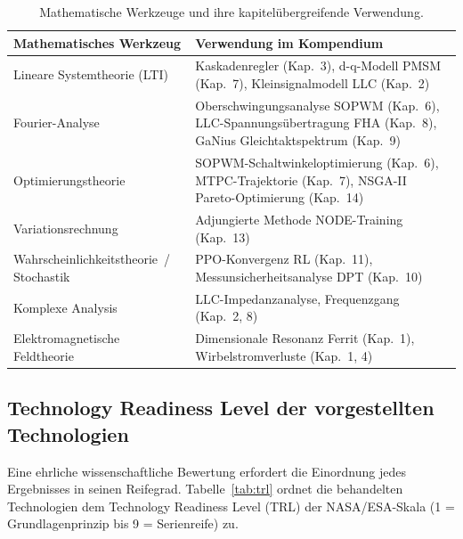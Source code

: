 ﻿\documentclass[a4paper,12pt,openany,oneside]{book}
\newcommand{\unterabschnitt}[1]{\subsection{#1}}
\theoremstyle{definition}
\begin{document}
\begin{table}[H]
\centering
\renewcommand{\arraystretch}{1.35}
\begin{tabular}{p{4.0cm}p{8.5cm}}
\toprule
\textbf{Mathematisches Werkzeug} & \textbf{Verwendung im Kompendium} \\
\midrule
Lineare Systemtheorie (LTI) &
  Kaskadenregler (Kap.\ 3), d-q-Modell PMSM (Kap.\ 7),
  Kleinsignalmodell LLC (Kap.\ 2) \\
Fourier-Analyse &
  Oberschwingungsanalyse SOPWM (Kap.\ 6),
  LLC-Spannungs\"ubertragung FHA (Kap.\ 8),
  GaNius Gleichtaktspektrum (Kap.\ 9) \\
Optimierungstheorie &
  SOPWM-Schaltwinkeloptimierung (Kap.\ 6),
  MTPC-Trajektorie (Kap.\ 7),
  NSGA-II Pareto-Optimierung (Kap.\ 14) \\
Variationsrechnung &
  Adjungierte Methode NODE-Training (Kap.\ 13) \\
Wahr\-schein\-lich\-keits\-theorie~/ Stochastik &
  PPO-Konvergenz RL (Kap.\ 11),
  Messunsicherheitsanalyse DPT (Kap.\ 10) \\
Komplexe Analysis &
  LLC-Impedanzanalyse, Frequenzgang (Kap.\ 2, 8) \\
Elektromagnetische Feldtheorie &
  Dimensionale Resonanz Ferrit (Kap.\ 1),
  Wirbelstromverluste (Kap.\ 1, 4) \\
\bottomrule
\end{tabular}
\caption{Mathematische Werkzeuge und ihre kapitel\"ubergreifende Verwendung.}
\label{tab:mathfundament}
\end{table}

\unterabschnitt{Technology Readiness Level der vorgestellten Technologien}

Eine ehrliche wissenschaftliche Bewertung erfordert die Einordnung jedes Ergebnisses
in seinen Reifegrad. Tabelle~\ref{tab:trl} ordnet die behandelten Technologien dem
Technology Readiness Level (TRL) der NASA/ESA-Skala (1 = Grundlagenprinzip bis
9 = Serienreife) zu.
\end{document}
